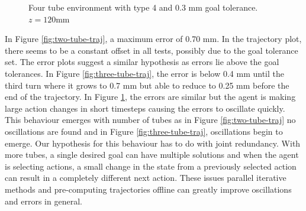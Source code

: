 \begin{figure}
    \caption{Four tube environment with type 4 and 0.3 mm goal tolerance. $z=120$mm}
    \label{fig:four-tube-traj}
\end{figure}

In Figure \ref{fig:two-tube-traj}, a maximum error of 0.70 mm. In the trajectory plot, there seems to be a constant offset in all tests, possibly due to the goal tolerance set. The error plots suggest a similar hypothesis as errors lie above the goal tolerances. In Figure \ref{fig:three-tube-traj}, the error is below 0.4 mm until the third turn where it grows to 0.7 mm but able to reduce to 0.25 mm before the end of the trajectory. In Figure \ref{fig:four-tube-traj}, the errors are similar but the agent is making large action changes in short timesteps causing the errors to oscillate quickly. This behaviour emerges with number of tubes as in Figure \ref{fig:two-tube-traj} no oscillations are found and in Figure \ref{fig:three-tube-traj}, oscillations begin to emerge. Our hypothesis for this behaviour has to do with joint redundancy. With more tubes, a single desired goal can have multiple solutions and when the agent is selecting actions, a small change in the state from a previously selected action can result in a completely different next action. These issues parallel iterative methods and pre-computing trajectories offline can greatly improve oscillations and errors in general.


